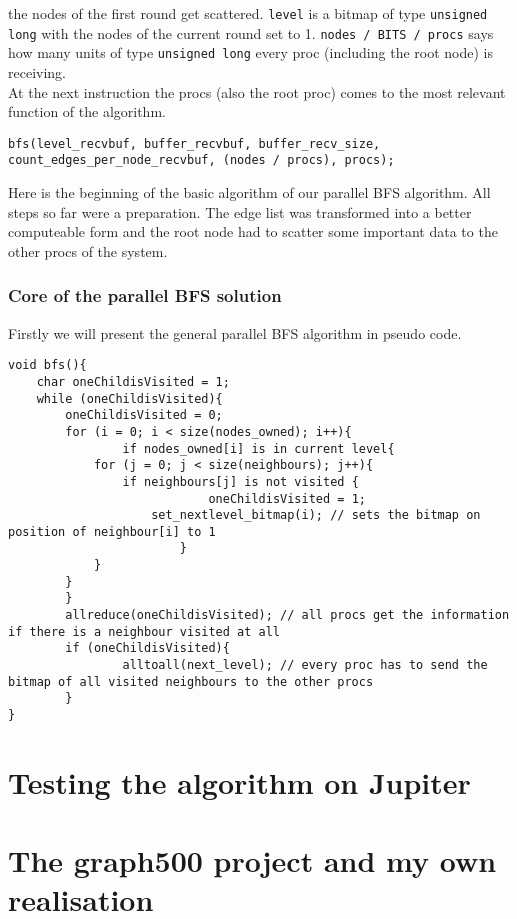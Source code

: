 \documentclass[11pt,a4paper]{article}
\begin{document}
the nodes of the first round get scattered. \lstinline{level} is a bitmap of type \lstinline{unsigned long} with the nodes of the current round set to 1. \lstinline{nodes / BITS / procs} says how many units of type \lstinline{unsigned long} every proc (including the root node) is receiving. \\
At the next instruction the procs (also the root proc) comes to the most relevant function of the algorithm.
\begin{lstlisting}
bfs(level_recvbuf, buffer_recvbuf, buffer_recv_size, count_edges_per_node_recvbuf, (nodes / procs), procs);
\end{lstlisting}
Here is the beginning of the basic algorithm of our parallel BFS algorithm. All steps so far were a preparation. The edge list was transformed into a better computeable form and the root node had to scatter some important data to the other procs of the system.
\subsubsection{Core of the parallel BFS solution}
Firstly we will present the general parallel BFS algorithm in pseudo code.
\begin{lstlisting}
void bfs(){
    char oneChildisVisited = 1;
    while (oneChildisVisited){
        oneChildisVisited = 0;
        for (i = 0; i < size(nodes_owned); i++){
        		if nodes_owned[i] is in current level{
			for (j = 0; j < size(neighbours); j++){
				if neighbours[j] is not visited {
            				oneChildisVisited = 1;
					set_nextlevel_bitmap(i); // sets the bitmap on position of neighbour[i] to 1
            			}
			}
		}
        }
        allreduce(oneChildisVisited); // all procs get the information if there is a neighbour visited at all
        if (oneChildisVisited){
        		alltoall(next_level); // every proc has to send the bitmap of all visited neighbours to the other procs
        }
}
\end{lstlisting}
\section{Testing the algorithm on Jupiter}
\label{sec:testing}


\section{The graph500 project and my own realisation}
\label{sec:graph500}
\end{document}
